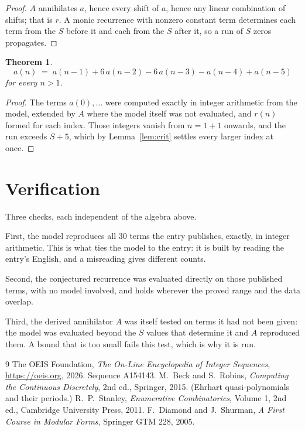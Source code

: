 \documentclass[11pt,a4paper]{article}
\theoremstyle{plain}
\newtheorem{theorem}{Theorem}
\theoremstyle{definition}
\begin{document}
\begin{proof}
$A$ annihilates $a$, hence every shift of $a$, hence any linear combination of shifts; that is
$r$. A monic recurrence with nonzero constant term determines each term from the $S$ before it
and each from the $S$ after it, so a run of $S$ zeros propagates.
\end{proof}

\begin{theorem}
\[
a(n)\;=\;a(n-1) + 6\,a(n-2) - 6\,a(n-3) - a(n-4) + a(n-5)
\]
for every $n>1$.
\end{theorem}

\begin{proof}
The terms $a(0),\dots$ were computed exactly in integer arithmetic from the model, extended by
$A$ where the model itself was not evaluated, and $r(n)$ formed for each index. Those integers
vanish from $n=1+1$ onwards, and the run exceeds $S+5$, which by
Lemma~\ref{lem:crit} settles every larger index at once.
\end{proof}

\section{Verification}

Three checks, each independent of the algebra above.

First, the model reproduces all $30$ terms the entry publishes, exactly, in integer
arithmetic. This is what ties the model to the entry: it is built by reading the entry's
English, and a misreading gives different counts.

Second, the conjectured recurrence was evaluated directly on those published terms, with no
model involved, and holds wherever the proved range and the data overlap.

Third, the derived annihilator $A$ was itself tested on terms it had not been given: the model
was evaluated beyond the $S$ values that determine it and $A$ reproduced them. A bound that is
too small fails this test, which is why it is run.

\begin{thebibliography}{9}
 The OEIS Foundation, \emph{The On-Line Encyclopedia of Integer
Sequences}, \url{https://oeis.org}, 2026. Sequence A154143.
 M.~Beck and S.~Robins, \emph{Computing the Continuous Discretely},
2nd ed., Springer, 2015. (Ehrhart quasi-polynomials and their periods.)
 R.~P.~Stanley, \emph{Enumerative Combinatorics}, Volume 1, 2nd ed.,
Cambridge University Press, 2011.
 F.~Diamond and J.~Shurman, \emph{A First Course in Modular Forms},
Springer GTM 228, 2005.
\end{thebibliography}
\end{document}
